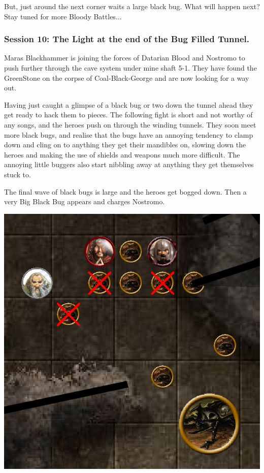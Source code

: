 But, just around the next corner waits a large black bug. What will happen next? Stay tuned for more Bloody Battles...


\subsubsection*{Session 10: The Light at the end of the Bug Filled Tunnel.}
Maras Blackhammer is joining the forces of Datarian Blood and Nostromo to push further through the cave system under mine shaft 5-1. They have found the GreenStone on the corpse of Coal-Black-George and are now looking for a way out.

Having just caught a glimpse of a black bug or two down the tunnel ahead they get ready to hack them to pieces. The following fight is short and not worthy of any songs, and the heroes push on through the winding tunnels. They soon meet more black bugs, and realise that the bugs have an annoying tendency to clamp down and cling on to anything they get their mandibles on, slowing down the heroes and making the use of shields and weapons much more difficult. The annoying little buggers also start nibbling away at anything they get themselves stuck to.

The final wave of black bugs is large and the heroes get bogged down. Then a very Big Black Bug appears and charges Nostromo.

\begin{center}
\vspace{0.5 cm}
\includegraphics[width=0.7\linewidth]{./figs/playthrough/bug-fight.png}
\vspace{0.5 cm}
\end{center}

